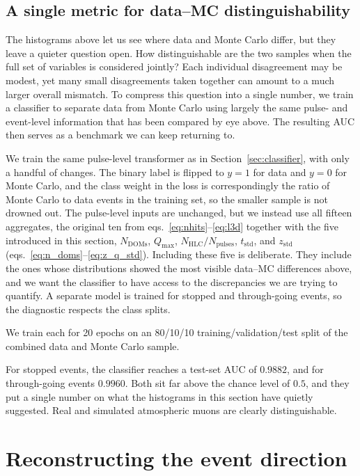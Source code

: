 \subsection{A single metric for data--MC distinguishability}
\label{subsec:single_metric}

The histograms above let us see where data and Monte Carlo differ, but they leave a quieter question open. How distinguishable are the two samples when the full set of variables is considered jointly? Each individual disagreement may be modest, yet many small disagreements taken together can amount to a much larger overall mismatch. To compress this question into a single number, we train a classifier to separate data from Monte Carlo using largely the same pulse- and event-level information that has been compared by eye above. The resulting AUC then serves as a benchmark we can keep returning to.

We train the same pulse-level transformer as in Section~\ref{sec:classifier}, with only a handful of changes. The binary label is flipped to $y=1$ for data and $y=0$ for Monte Carlo, and the class weight in the loss is correspondingly the ratio of Monte Carlo to data events in the training set, so the smaller sample is not drowned out. The pulse-level inputs are unchanged, but we instead use all fifteen aggregates, the original ten from eqs.~\eqref{eq:nhits}--\eqref{eq:l3d} together with the five introduced in this section, $N_{\mathrm{DOMs}}$, $Q_{\max}$, $N_{\mathrm{HLC}}/N_{\mathrm{pulses}}$, $t_{\mathrm{std}}$, and $z_{\mathrm{std}}$ (eqs.~\eqref{eq:n_doms}--\eqref{eq:z_q_std}). Including these five is deliberate. They include the ones whose distributions showed the most visible data--MC differences above, and we want the classifier to have access to the discrepancies we are trying to quantify. A separate model is trained for stopped and through-going events, so the diagnostic respects the class splits.

We train each for 20 epochs on an 80/10/10 training/validation/test split of the combined data and Monte Carlo sample.

For stopped events, the classifier reaches a test-set AUC of $0.9882$, and for through-going events $0.9960$. Both sit far above the chance level of $0.5$, and they put a single number on what the histograms in this section have quietly suggested. Real and simulated atmospheric muons are clearly distinguishable.


\section{Reconstructing the event direction}
\label{sec:direction_reco}

